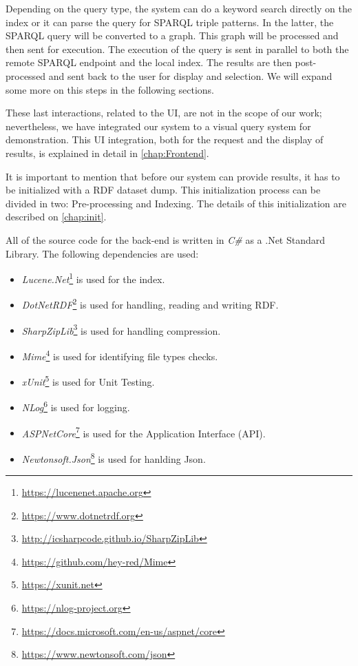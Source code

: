 Depending on the query type, the system can do a keyword search directly on the index or it can parse the query for SPARQL triple patterns. 
In the latter, the SPARQL query will be converted to a graph. 
This graph will be processed and then sent for execution. 
The execution of the query is sent in parallel to both the remote SPARQL endpoint and the local index. 
The results are then post-processed and sent back to the user for display and selection. 
We will expand some more on this steps in the following sections.

These last interactions, related to the UI, are not in the scope of our work; nevertheless, we have integrated our system to a visual query system for demonstration. 
This UI integration, both for the request and the display of results, is explained in detail in \autoref{chap:Frontend}.

It is important to mention that before our system can provide results, it has to be initialized with a RDF dataset dump. 
This initialization process can be divided in two: 
Pre-processing and Indexing. 
The details of this initialization are described on \autoref{chap:init}. 

All of the source code for the back-end is written in \textit{C\#} as a .Net Standard Library. 
The following dependencies are used:

\begin{itemize}
    \item \textit{Lucene.Net}\footnote{\url{https://lucenenet.apache.org}} is used for the index. 
    \item \textit{DotNetRDF}\footnote{\url{https://www.dotnetrdf.org}} is used for handling, reading and writing RDF.
    \item \textit{SharpZipLib}\footnote{\url{http://icsharpcode.github.io/SharpZipLib}} is used for handling compression.
    \item \textit{Mime}\footnote{\url{https://github.com/hey-red/Mime}} is used for identifying file types checks.
    \item \textit{xUnit}\footnote{\url{https://xunit.net}} is used for Unit Testing.
    \item \textit{NLog}\footnote{\url{https://nlog-project.org}} is used for logging.
    \item \textit{ASPNetCore}\footnote{\url{https://docs.microsoft.com/en-us/aspnet/core}} is used for the Application Interface (API).
    \item \textit{Newtonsoft.Json}\footnote{\url{https://www.newtonsoft.com/json}} is used for hanlding Json.
\end{itemize}

